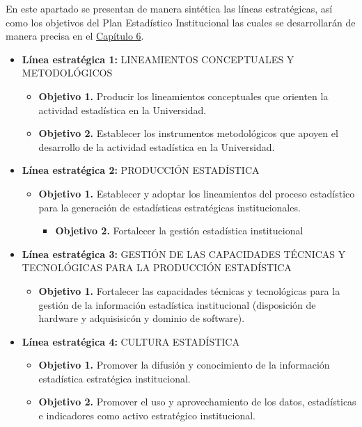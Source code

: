\documentclass[
]{book}
\providecommand{\tightlist}{%
  \setlength{\itemsep}{0pt}\setlength{\parskip}{0pt}}
\begin{document}
En este apartado se presentan de manera sintética las líneas estratégicas, así como los objetivos del Plan Estadístico Institucional las cuales se desarrollarán de manera precisa en el \protect\hyperlink{Cap6}{Capítulo 6}.

\begin{itemize}
\item
  \textbf{Línea estratégica 1:} LINEAMIENTOS CONCEPTUALES Y METODOLÓGICOS

  \begin{itemize}
  \item
    \textbf{Objetivo 1.} Producir los lineamientos conceptuales que orienten la actividad estadística en la Universidad.
  \item
    \textbf{Objetivo 2.} Establecer los instrumentos metodológicos que apoyen el desarrollo de la actividad estadística en la Universidad.
  \end{itemize}
\item
  \textbf{Línea estratégica 2:} PRODUCCIÓN ESTADÍSTICA

  \begin{itemize}
  \item
    \textbf{Objetivo 1.} Establecer y adoptar los lineamientos del proceso estadístico para la generación de estadísticas estratégicas institucionales.

    \begin{itemize}
    \tightlist
    \item
      \textbf{Objetivo 2.} Fortalecer la gestión estadística institucional
    \end{itemize}
  \end{itemize}
\item
  \textbf{Línea estratégica 3:} GESTIÓN DE LAS CAPACIDADES TÉCNICAS Y TECNOLÓGICAS PARA LA PRODUCCIÓN ESTADÍSTICA

  \begin{itemize}
  \tightlist
  \item
    \textbf{Objetivo 1.} Fortalecer las capacidades técnicas y tecnológicas para la gestión de la información estadística institucional (disposición de hardware y adquisisicón y dominio de software).
  \end{itemize}
\item
  \textbf{Línea estratégica 4:} CULTURA ESTADÍSTICA

  \begin{itemize}
  \item
    \textbf{Objetivo 1.} Promover la difusión y conocimiento de la información estadística estratégica institucional.
  \item
    \textbf{Objetivo 2.} Promover el uso y aprovechamiento de los datos, estadísticas e indicadores como activo estratégico institucional.
  \end{itemize}
\end{itemize}
\end{document}
